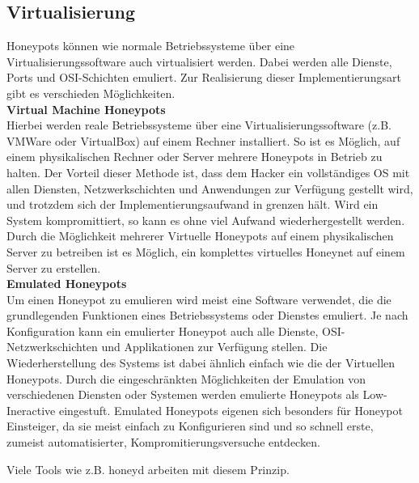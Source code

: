 \subsection{Virtualisierung}
Honeypots können wie normale Betriebssysteme über eine Virtualisierungssoftware auch virtualisiert werden. Dabei werden alle Dienste, Ports und OSI-Schichten emuliert. Zur Realisierung dieser Implementierungsart gibt es verschieden Möglichkeiten.\\

\noindent\textbf{Virtual Machine Honeypots}\\
Hierbei werden reale Betriebssysteme über eine Virtualisierungssoftware (z.B. VMWare oder VirtualBox) auf einem Rechner installiert. So ist es Möglich, auf einem physikalischen Rechner oder Server mehrere Honeypots in Betrieb zu halten. Der Vorteil dieser Methode ist, dass dem Hacker ein vollständiges OS mit allen Diensten, Netzwerkschichten und Anwendungen zur Verfügung gestellt wird, und trotzdem sich der Implementierungsaufwand in grenzen hält. Wird ein System kompromittiert, so kann es ohne viel Aufwand wiederhergestellt werden. Durch die Möglichkeit mehrerer Virtuelle Honeypots auf einem physikalischen Server zu betreiben ist es Möglich, ein komplettes virtuelles Honeynet auf einem Server zu erstellen.  \\

\noindent\textbf{Emulated Honeypots}\\
Um einen Honeypot zu emulieren wird meist eine Software verwendet, die die grundlegenden Funktionen eines Betriebssystems oder Dienstes emuliert. Je nach Konfiguration kann ein emulierter Honeypot auch alle Dienste, OSI-Netzwerkschichten und Applikationen zur Verfügung stellen. Die Wiederherstellung des Systems ist dabei ähnlich einfach wie die der Virtuellen Honeypots. Durch die eingeschränkten Möglichkeiten der Emulation von verschiedenen Diensten oder Systemen werden emulierte Honeypots als Low-Ineractive eingestuft. Emulated Honeypots eigenen sich besonders für Honeypot Einsteiger, da sie meist einfach zu Konfigurieren sind und so schnell erste, zumeist automatisierter, Kompromitierungsversuche entdecken.
 
Viele Tools wie z.B. honeyd arbeiten mit diesem Prinzip.
\newpage